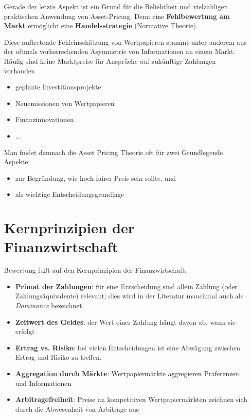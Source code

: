 \documentclass[12pt]{extreport} %
\theoremstyle{named}
\theoremstyle{nnamed}
\theoremstyle{itshape}
\theoremstyle{normal}
\begin{document}
Gerade der letzte Aspekt ist ein Grund für die Beliebtheit und vielzähligen praktischen Anwendung von Asset-Pricing. Denn eine \textbf{Fehlbewertung am Markt} ermöglicht eine \textbf{Handelsstrategie} (Normative Theorie). ~\bigskip

Diese auftretende Fehleinschätzung von Wertpapieren stammt unter anderem aus der oftmals vorherrschenden Asymmetrie von Informationen an einem Markt. Häufig sind keine Marktpreise für Ansprüche auf zukünftige Zahlungen vorhanden
\begin{itemize}
	\item geplante Investitionsprojekte
	\item Neuemissionen von Wertpapieren
	\item Finanzinnovationen
	\item $\dotsc$
\end{itemize}

Man findet demnach die Asset Pricing Theorie oft für zwei Grundlegende Aspekte:
\begin{itemize}
	\item zur Begründung, wie hoch fairer Preis sein sollte, und
	\item als wichtige Entscheidungsgrundlage
\end{itemize}

\section*{Kernprinzipien der Finanzwirtschaft}
Bewertung fußt auf den Kernprinzipien der Finanzwirtschaft:
\begin{itemize}
	\item \textbf{Primat der Zahlungen}: für eine Entscheidung sind allein Zahlung (oder Zahlungsäquivalente) relevant; dies wird in der Literatur manchmal auch als \textit{Dominance} bezeichnet.
	\item \textbf{Zeitwert des Geldes}: der Wert einer Zahlung hängt davon ab, wann sie erfolgt
	\item \textbf{Ertrag vs. Risiko}: bei vielen Entscheidungen ist eine Abwägung zwischen Ertrag und Risiko zu treffen.
	\item \textbf{Aggregation durch Märkte}: Wertpapiermärkte aggregieren Präferenzen und Informationen
	\item \textbf{Arbitragefreiheit}: Preise an kompetitiven Wertpapiermärkten zeichnen sich durch die Abwesenheit von Arbitrage aus
\end{itemize}
\end{document}
